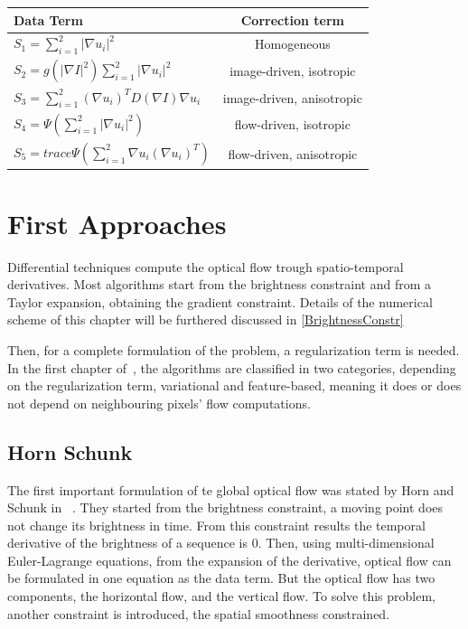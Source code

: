 \documentclass[12pt,a4paper,twoside]{report}
\begin{document}
{\renewcommand{\arraystretch}{2}
	\begin{center}
		
		\begin{tabular}{| l | c |}
			\hline
			Data Term & Correction term  \\ \hline
			$S_1 = \sum_{i=1}^{2}{|\nabla u_i|^2}$ & Homogeneous \\ \hline
			
			$S_2 = g \left( |\nabla I|^2 \right) \sum_{i=1}^{2} {|\nabla u_i|^2}$ & image-driven, isotropic  \\ \hline
			
			$S_3 = \sum_{i=1}^{2} \left( \nabla u_i \right)^T D \left( \nabla I \right) \nabla u_i$ & image-driven, anisotropic  \\
			\hline
			
			$S_4 = \Psi \left( \sum_{i=1}^{2} |\nabla u_i|^2 \right)$ & flow-driven, isotropic  \\
			\hline
			
			$S_5 = trace \Psi \left( \sum_{i=1}^{2} \nabla u_i \left( \nabla u_i \right)^T \right)$  & flow-driven, anisotropic \\
			\hline
		\end{tabular}
	\end{center}

\section{First Approaches}

Differential techniques compute the optical flow trough spatio-temporal derivatives.
Most algorithms start from the brightness constraint and from a Taylor expansion, obtaining the gradient constraint. Details of the numerical scheme of this chapter will be furthered discussed in \ref{BrightnessConstr}

Then, for a complete formulation of the problem, a regularization term is needed. In the first chapter of~\cite{wedel2011stereo}, the algorithms are classified in two categories, depending on the regularization term, variational and feature-based, meaning it does or does not depend on neighbouring pixels' flow computations.
\subsection{Horn Schunk}
The first important formulation of te global optical flow was stated by Horn and Schunk in ~\cite{HSOpticalFlow}. They started from the brightness constraint, a moving point does not change its brightness in time. From this constraint results the temporal derivative of the brightness of a sequence is $0$. Then,  using multi-dimensional Euler-Lagrange equations, from the expansion of the derivative, optical flow  can be formulated in one equation as the data term. But the optical flow has two components, the horizontal flow, and the vertical flow. To solve this problem, another constraint is introduced, the spatial smoothness constrained. 

}
\end{document}
